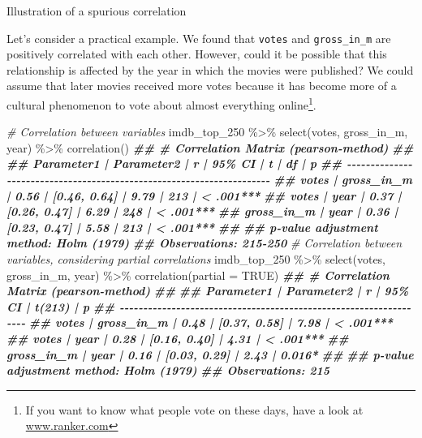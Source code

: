 \documentclass[
]{book}
\newenvironment{Shaded}{\begin{snugshade}}{\end{snugshade}}
\newcommand{\AttributeTok}[1]{\textcolor[rgb]{0.77,0.63,0.00}{#1}}
\newcommand{\CommentTok}[1]{\textcolor[rgb]{0.56,0.35,0.01}{\textit{#1}}}
\newcommand{\ConstantTok}[1]{\textcolor[rgb]{0.00,0.00,0.00}{#1}}
\newcommand{\DocumentationTok}[1]{\textcolor[rgb]{0.56,0.35,0.01}{\textbf{\textit{#1}}}}
\newcommand{\FunctionTok}[1]{\textcolor[rgb]{0.00,0.00,0.00}{#1}}
\newcommand{\NormalTok}[1]{#1}
\newcommand{\SpecialCharTok}[1]{\textcolor[rgb]{0.00,0.00,0.00}{#1}}
\begin{document}
\label{fig:illustration-spurious-correlation}Illustration of a spurious correlation

Let's consider a practical example. We found that \texttt{votes} and \texttt{gross\_in\_m} are positively correlated with each other. However, could it be possible that this relationship is affected by the year in which the movies were published? We could assume that later movies received more votes because it has become more of a cultural phenomenon to vote about almost everything online\footnote{If you want to know what people vote on these days, have a look at \href{https://www.ranker.com}{www.ranker.com}}.

\begin{Shaded}
\begin{Highlighting}[]
\CommentTok{\# Correlation between variables}
\NormalTok{imdb\_top\_250 }\SpecialCharTok{\%\textgreater{}\%}
  \FunctionTok{select}\NormalTok{(votes, gross\_in\_m, year) }\SpecialCharTok{\%\textgreater{}\%}
  \FunctionTok{correlation}\NormalTok{()}
\DocumentationTok{\#\# \# Correlation Matrix (pearson{-}method)}
\DocumentationTok{\#\# }
\DocumentationTok{\#\# Parameter1 | Parameter2 |    r |       95\% CI |    t |  df |         p}
\DocumentationTok{\#\# {-}{-}{-}{-}{-}{-}{-}{-}{-}{-}{-}{-}{-}{-}{-}{-}{-}{-}{-}{-}{-}{-}{-}{-}{-}{-}{-}{-}{-}{-}{-}{-}{-}{-}{-}{-}{-}{-}{-}{-}{-}{-}{-}{-}{-}{-}{-}{-}{-}{-}{-}{-}{-}{-}{-}{-}{-}{-}{-}{-}{-}{-}{-}{-}{-}{-}{-}{-}{-}{-}}
\DocumentationTok{\#\# votes      | gross\_in\_m | 0.56 | [0.46, 0.64] | 9.79 | 213 | \textless{} .001***}
\DocumentationTok{\#\# votes      |       year | 0.37 | [0.26, 0.47] | 6.29 | 248 | \textless{} .001***}
\DocumentationTok{\#\# gross\_in\_m |       year | 0.36 | [0.23, 0.47] | 5.58 | 213 | \textless{} .001***}
\DocumentationTok{\#\# }
\DocumentationTok{\#\# p{-}value adjustment method: Holm (1979)}
\DocumentationTok{\#\# Observations: 215{-}250}
\CommentTok{\# Correlation between variables, considering partial correlations}
\NormalTok{imdb\_top\_250 }\SpecialCharTok{\%\textgreater{}\%}
  \FunctionTok{select}\NormalTok{(votes, gross\_in\_m, year) }\SpecialCharTok{\%\textgreater{}\%}
  \FunctionTok{correlation}\NormalTok{(}\AttributeTok{partial =} \ConstantTok{TRUE}\NormalTok{)}
\DocumentationTok{\#\# \# Correlation Matrix (pearson{-}method)}
\DocumentationTok{\#\# }
\DocumentationTok{\#\# Parameter1 | Parameter2 |    r |       95\% CI | t(213) |         p}
\DocumentationTok{\#\# {-}{-}{-}{-}{-}{-}{-}{-}{-}{-}{-}{-}{-}{-}{-}{-}{-}{-}{-}{-}{-}{-}{-}{-}{-}{-}{-}{-}{-}{-}{-}{-}{-}{-}{-}{-}{-}{-}{-}{-}{-}{-}{-}{-}{-}{-}{-}{-}{-}{-}{-}{-}{-}{-}{-}{-}{-}{-}{-}{-}{-}{-}{-}{-}{-}{-}}
\DocumentationTok{\#\# votes      | gross\_in\_m | 0.48 | [0.37, 0.58] |   7.98 | \textless{} .001***}
\DocumentationTok{\#\# votes      |       year | 0.28 | [0.16, 0.40] |   4.31 | \textless{} .001***}
\DocumentationTok{\#\# gross\_in\_m |       year | 0.16 | [0.03, 0.29] |   2.43 | 0.016*   }
\DocumentationTok{\#\# }
\DocumentationTok{\#\# p{-}value adjustment method: Holm (1979)}
\DocumentationTok{\#\# Observations: 215}
\end{Highlighting}
\end{Shaded}
\end{document}
